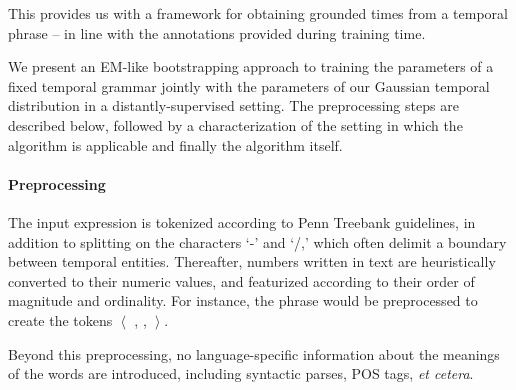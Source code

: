 This provides us with a framework for obtaining grounded times from a
	temporal phrase -- in line with the annotations provided during training
	time.


We present an EM-like bootstrapping approach to training the parameters of
	a fixed temporal grammar jointly with the parameters of our Gaussian
	temporal distribution in a distantly-supervised setting.
The preprocessing steps are described below, followed by a characterization
	of the setting in which the algorithm is applicable and
	finally the algorithm itself.

\paragraph{Preprocessing}
The input expression is tokenized according to Penn Treebank guidelines,
	in addition to splitting on the characters `-' and `/,' which
	often delimit a boundary between temporal entities.
Thereafter, numbers written in text are heuristically converted to their
	numeric values, and featurized according to their order of magnitude
	and ordinality.
For instance, the phrase  would be preprocessed to create the
	tokens $\left<\right.$  , \tp{-} ,  
		$\left.\right>$.

Beyond this preprocessing, no language-specific information about the meanings
	of the words are introduced, including syntactic parses, POS tags,
	\textit{et cetera}.


